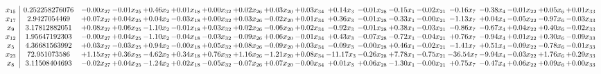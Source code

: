 \documentclass[9pt]{article}
\begin{document}
 \[\begin{array}{c| c c@{\hskip 2pt} c@{\hskip 2pt} c@{\hskip 2pt} c@{\hskip 2pt} c@{\hskip 2pt} c@{\hskip 2pt} c@{\hskip 2pt} c@{\hskip 2pt} c@{\hskip 2pt} c@{\hskip 2pt} c@{\hskip 2pt} c@{\hskip 2pt} c@{\hskip 2pt} c@{\hskip 2pt} c@{\hskip 2pt} c@{\hskip 2pt} c@{\hskip 2pt} }
 x_{15}   &  0.252258276076 & -0.00 x_{27} & -0.01 x_{25} & +  0.46 x_{2} & +  0.01 x_{18} & +  0.00 x_{32} & +  0.02 x_{26} & +  0.03 x_{20} & +  0.03 x_{34} & +  0.14 x_{3} & -0.01 x_{28} & -0.15 x_{1} & -0.02 x_{21} & -0.16 x_{7} & -0.38 x_{4} & -0.01 x_{22} & +  0.05 x_{6} & +  0.01 x_{33}\\
 x_{17}   &  2.9427054469 & +  0.07 x_{27} & +  0.04 x_{25} & +  0.04 x_{2} & -0.03 x_{18} & +  0.00 x_{32} & +  0.03 x_{26} & -0.02 x_{20} & +  0.01 x_{34} & +  0.36 x_{3} & -0.01 x_{28} & -0.33 x_{1} & -0.00 x_{21} & -1.13 x_{7} & +  0.04 x_{4} & -0.05 x_{22} & -0.97 x_{6} & -0.03 x_{33}\\
 x_{9}   &  3.17812882051 & +  0.08 x_{27} & +  0.06 x_{25} & -1.10 x_{2} & -0.01 x_{18} & +  0.03 x_{32} & +  0.02 x_{26} & -0.06 x_{20} & +  0.02 x_{34} & -0.92 x_{3} & -0.01 x_{28} & +  0.38 x_{1} & -0.03 x_{21} & -0.86 x_{7} & -0.67 x_{4} & +  0.04 x_{22} & +  0.40 x_{6} & -0.02 x_{33}\\
 x_{12}   &  1.95647192303 & -0.00 x_{27} & +  0.04 x_{25} & -1.10 x_{2} & -0.04 x_{18} & -0.03 x_{32} & -0.09 x_{26} & +  0.06 x_{20} & -0.01 x_{34} & +  0.43 x_{3} & -0.07 x_{28} & -0.72 x_{1} & -0.04 x_{21} & +  0.76 x_{7} & -0.94 x_{4} & +  0.01 x_{22} & +  0.30 x_{6} & -0.09 x_{33}\\
 x_{5}   &  4.36681563992 & +  0.03 x_{27} & -0.03 x_{25} & +  0.94 x_{2} & -0.00 x_{18} & +  0.05 x_{32} & +  0.08 x_{26} & -0.09 x_{20} & +  0.03 x_{34} & -0.09 x_{3} & -0.00 x_{28} & +  0.46 x_{1} & -0.02 x_{21} & -1.41 x_{7} & +  0.51 x_{4} & -0.09 x_{22} & -0.78 x_{6} & -0.01 x_{33}\\
 x_{23}   &  72.951073586 & +  1.15 x_{27} & +  0.36 x_{25} & -4.62 x_{2} & +  0.34 x_{18} & +  0.76 x_{32} & +  1.16 x_{26} & -1.21 x_{20} & +  0.08 x_{34} & -11.17 x_{3} & -0.26 x_{28} & +  7.78 x_{1} & -0.75 x_{21} & -36.54 x_{7} & -9.94 x_{4} & -0.03 x_{22} & +  1.76 x_{6} & +  0.29 x_{33}\\
 x_{8}   &  3.11508404693 & -0.02 x_{27} & +  0.04 x_{25} & -1.24 x_{2} & +  0.02 x_{18} & -0.05 x_{32} & -0.07 x_{26} & +  0.07 x_{20} & -0.00 x_{34} & +  0.01 x_{3} & +  0.06 x_{28} & -1.30 x_{1} & -0.00 x_{21} & +  0.75 x_{7} & -0.47 x_{4} & +  0.06 x_{22} & +  0.09 x_{6} & +  0.00 x_{33}\\

\end{array}\]
\end{document}
